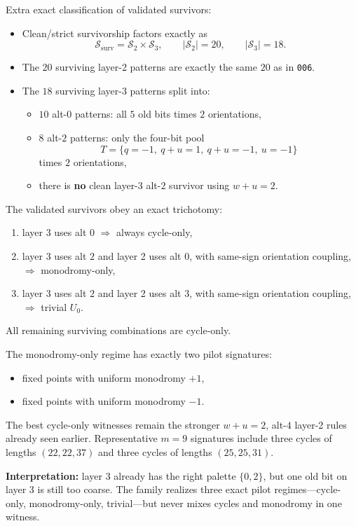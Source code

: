 \documentclass[11pt]{article}
\begin{document}
Extra exact classification of validated survivors:
\begin{itemize}
    \item Clean/strict survivorship factors exactly as
    \[
    \mathcal S_{\mathrm{surv}} = \mathcal S_2 \times \mathcal S_3,
    \qquad |\mathcal S_2|=20,
    \qquad |\mathcal S_3|=18.
    \]
    \item The $20$ surviving layer-2 patterns are exactly the same $20$ as in \texttt{006}.
    \item The $18$ surviving layer-3 patterns split into:
    \begin{itemize}
        \item $10$ alt-$0$ patterns: all $5$ old bits times $2$ orientations,
        \item $8$ alt-$2$ patterns: only the four-bit pool
        \[
        T=\{q=-1,\ q+u=1,\ q+u=-1,\ u=-1\}
        \]
        times $2$ orientations,
        \item there is \textbf{no} clean layer-3 alt-$2$ survivor using $w+u=2$.
    \end{itemize}
\end{itemize}

The validated survivors obey an exact trichotomy:
\begin{enumerate}
    \item layer 3 uses alt $0$ $\Rightarrow$ always cycle-only,
    \item layer 3 uses alt $2$ and layer 2 uses alt $0$, with same-sign orientation coupling, $\Rightarrow$ monodromy-only,
    \item layer 3 uses alt $2$ and layer 2 uses alt $3$, with same-sign orientation coupling, $\Rightarrow$ trivial $U_0$.
\end{enumerate}
All remaining surviving combinations are cycle-only.

The monodromy-only regime has exactly two pilot signatures:
\begin{itemize}
    \item fixed points with uniform monodromy $+1$,
    \item fixed points with uniform monodromy $-1$.
\end{itemize}

The best cycle-only witnesses remain the stronger $w+u=2$, alt-$4$ layer-2 rules already seen earlier. Representative $m=9$ signatures include three cycles of lengths $(22,22,37)$ and three cycles of lengths $(25,25,31)$.

\textbf{Interpretation:} layer 3 already has the right palette $\{0,2\}$, but one old bit on layer 3 is still too coarse. The family realizes three exact pilot regimes---cycle-only, monodromy-only, trivial---but never mixes cycles and monodromy in one witness.
\end{document}
